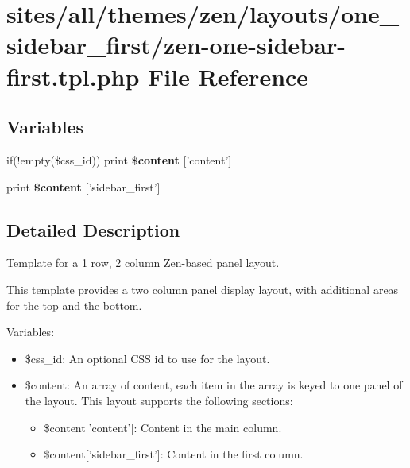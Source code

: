 \hypertarget{zen-one-sidebar-first_8tpl_8php}{
\section{sites/all/themes/zen/layouts/one\_\-sidebar\_\-first/zen-one-sidebar-first.tpl.php File Reference}
\label{zen-one-sidebar-first_8tpl_8php}
}
\subsection*{Variables}
\begin{CompactItemize}
\item 
\hypertarget{zen-one-sidebar-first_8tpl_8php_16767ac2e2b027ec00a0c12535d2ba7a}{
if(!empty(\$css\_\-id)) print \textbf{\$content} \mbox{[}'content'\mbox{]}}
\label{zen-one-sidebar-first_8tpl_8php_16767ac2e2b027ec00a0c12535d2ba7a}

\item 
\hypertarget{zen-one-sidebar-first_8tpl_8php_8fbe76276dfb5a084cc042c32e8e6394}{
print \textbf{\$content} \mbox{[}'sidebar\_\-first'\mbox{]}}
\label{zen-one-sidebar-first_8tpl_8php_8fbe76276dfb5a084cc042c32e8e6394}

\end{CompactItemize}


\subsection{Detailed Description}
Template for a 1 row, 2 column Zen-based panel layout.

This template provides a two column panel display layout, with additional areas for the top and the bottom.

Variables:\begin{itemize}
\item \$css\_\-id: An optional CSS id to use for the layout.\item \$content: An array of content, each item in the array is keyed to one panel of the layout. This layout supports the following sections:\begin{itemize}
\item \$content\mbox{[}'content'\mbox{]}: Content in the main column.\item \$content\mbox{[}'sidebar\_\-first'\mbox{]}: Content in the first column. \end{itemize}
\end{itemize}
